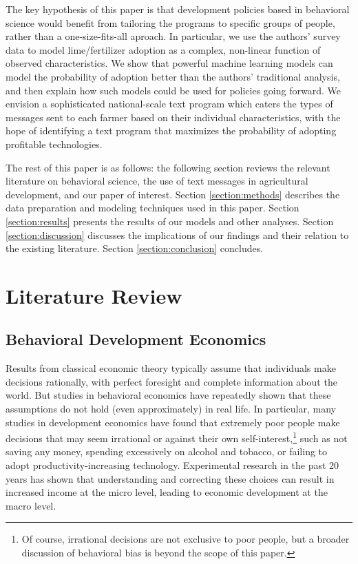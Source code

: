 \documentclass[12pt]{article}
\begin{document}
The key hypothesis of this paper is that development policies based in behavioral science would benefit from tailoring the programs to specific groups of people, rather than a one-size-fits-all aproach. In particular, we use the authors' survey data to model lime/fertilizer adoption as a complex, non-linear function of observed characteristics. We show that powerful machine learning models can model the probability of adoption better than the authors' traditional analysis, and then explain how such models could be used for policies going forward. We envision a sophisticated national-scale text program which caters the types of messages sent to each farmer based on their individual characteristics, with the hope of identifying a text program that maximizes the probability of adopting profitable technologies.

The rest of this paper is as follows: the following section reviews the relevant literature on behavioral science, the use of text messages in agricultural development, and our paper of interest. Section \ref{section:methods} describes the data preparation and modeling techniques used in this paper. Section \ref{section:results} presents the results of our models and other analyses. Section \ref{section:discussion} discusses the implications of our findings and their relation to the existing literature. Section \ref{section:conclusion} concludes.

\section{Literature Review}
\label{section:litreview}

\subsection{Behavioral Development Economics}
Results from classical economic theory typically assume that individuals make decisions rationally, with perfect foresight and complete information about the world. But studies in behavioral economics have repeatedly shown that these assumptions do not hold (even approximately) in real life. In particular, many studies in development economics have found that extremely poor people make decisions that may seem irrational or against their own self-interest,\footnote{Of course, irrational decisions are not exclusive to poor people, but a broader discussion of behavioral bias is beyond the scope of this paper.} such as not saving any money, spending excessively on alcohol and tobacco, or failing to adopt productivity-increasing technology. Experimental research in the past 20 years has shown that understanding and correcting these choices can result in increased income at the micro level, leading to economic development at the macro level.
\end{document}
